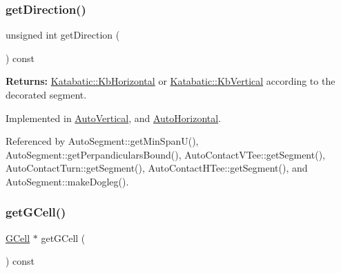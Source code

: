\mbox{\label{classKatabatic_1_1AutoSegment_ae35b78590ed6aa546b626ef95f28c533}} 
\subsubsection{\texorpdfstring{get\+Direction()}{getDirection()}}
{\footnotesize\ttfamily unsigned int get\+Direction (\begin{DoxyParamCaption}{ }\end{DoxyParamCaption}) const\hspace{0.3cm}{\ttfamily [pure virtual]}}

{\bfseries Returns\+:} \hyperlink{namespaceKatabatic_a2af2ad6b6441614038caf59d04b3b217a1a9045673c5d3c30b067100f1440ae1b}{Katabatic\+::\+Kb\+Horizontal} or \hyperlink{namespaceKatabatic_a2af2ad6b6441614038caf59d04b3b217a284cad95203a27172838b09e396e3590}{Katabatic\+::\+Kb\+Vertical} according to the decorated segment. 

Implemented in \hyperlink{classKatabatic_1_1AutoVertical_a0dd7cf705ace42c662c289955313b2e9}{Auto\+Vertical}, and \hyperlink{classKatabatic_1_1AutoHorizontal_a0dd7cf705ace42c662c289955313b2e9}{Auto\+Horizontal}.



Referenced by Auto\+Segment\+::get\+Min\+Span\+U(), Auto\+Segment\+::get\+Perpandiculars\+Bound(), Auto\+Contact\+V\+Tee\+::get\+Segment(), Auto\+Contact\+Turn\+::get\+Segment(), Auto\+Contact\+H\+Tee\+::get\+Segment(), and Auto\+Segment\+::make\+Dogleg().

\mbox{\label{classKatabatic_1_1AutoSegment_a819cf639562a031a1e2e061fe1293d66}} 
\subsubsection{\texorpdfstring{get\+G\+Cell()}{getGCell()}}
{\footnotesize\ttfamily \hyperlink{classKatabatic_1_1GCell}{G\+Cell} $\ast$ get\+G\+Cell (\begin{DoxyParamCaption}{ }\end{DoxyParamCaption}) const\hspace{0.3cm}{\ttfamily [inline]}}

